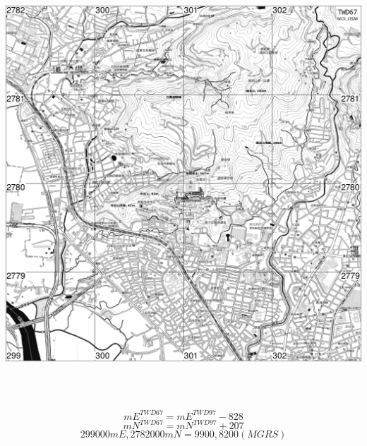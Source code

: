 \documentclass{article}
\begin{document}
\begin{multicols}{2}

\includegraphics[width=16cm, height=16cm]{osm-map.png}

\begin{equation} 
	mE^{TWD67 }= mE^{TWD97} - 828 
\end{equation} 
\begin{equation} 
	mN^{TWD67 }= mN^{TWD97} + 207
\end{equation} 
\begin{equation} 
	299000mE, 2782000mN = 9900, 8200 (MGRS)	
\end{equation} 


\end{multicols}
\end{document}
